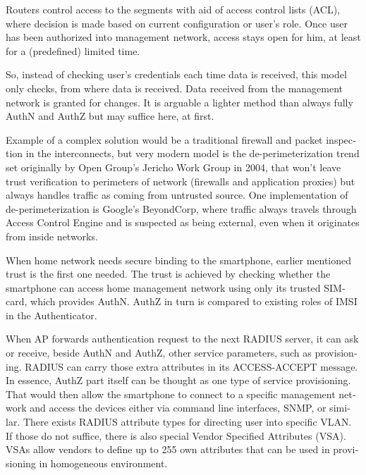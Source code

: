 \documentclass[12pt,a4paper,english]{tutthesis}
\begin{document}
\begin{otherlanguage}{english}
Routers control access to the segments with aid of 
access control lists (ACL), where decision is made based on current configuration or user's
role.  Once user has been authorized into management network, access
stays open for him, at least for a (predefined) limited time.

So, instead of checking user's credentials each time data is received,
this model only checks, from where data is received. 
Data received from the management network is granted for changes.
It is arguable a lighter method than always
fully AuthN and AuthZ but may suffice here, at first.



Example of a complex solution would be a traditional firewall and packet
inspection in the interconnects, but very modern model
is the de-perimeterization trend set originally by Open Group's
Jericho Work Group in 2004, that won't leave trust verification to
perimeters of network (firewalls and application proxies) but 
always handles traffic as coming from untrusted source.\cite{jericho2004}
One implementation of de-perimeterization is 
Google's BeyondCorp\cite{2014-beyondcorp}, 
where traffic always travels through Access Control Engine
and is suspected as being external, even when it originates from
inside networks. 





When home network needs secure binding to the smartphone, earlier
mentioned trust is the first one needed.  The trust is achieved by
checking whether the smartphone can access home management
network using only its trusted SIM-card, which provides AuthN. AuthZ in
turn is compared to existing roles of IMSI in the Authenticator.




When AP forwards authentication request to the next RADIUS server, it
can ask or receive, beside AuthN and AuthZ, other service parameters,
such as provisioning. RADIUS can carry those extra attributes in its
ACCESS-ACCEPT message.  In essence, AuthZ part itself can be thought
as one type of service provisioning.  That would then allow the
smartphone to connect to a specific management network and access the
devices either via command line interfaces, SNMP, or
similar\cite[p.4]{rfc5608}.
There exists RADIUS attribute types for directing user into specific
VLAN. If those do not suffice, there is also special Vendor Specified
Attributes (VSA). VSAs allow vendors to define up to 255 own
attributes that can be used in provisioning in homogeneous environment. 



\end{otherlanguage}
\end{document}
